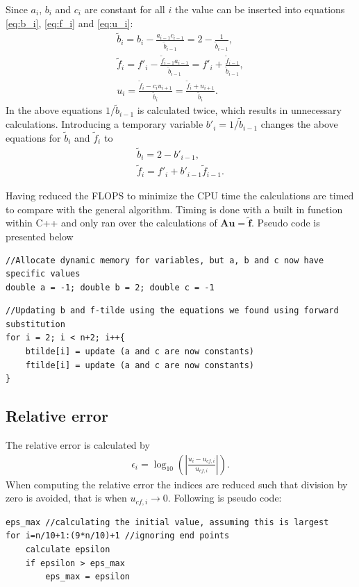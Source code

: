 \documentclass{emulateapj}
\begin{document}
Since $a_i$, $b_i$ and $c_i$ are constant for all $i$ the value can be inserted into equations \eqref{eq:b_i}, \eqref{eq:f_i} and \eqref{eq:u_i}:
%
\begin{gather*}
    \tilde{b}_i = b_i - \frac{a_{i-1}c_{i-1}}{\tilde{b}_{i-1}} = 2 - \frac{1}{\tilde{b}_{i-1}}, \\
    \tilde{f}_i = f'_i - \frac{\tilde{f}_{i-1} a_{i-1} }{\tilde{b}_{i-1}} = f'_i + \frac{\tilde{f}_{i-1}}{\tilde{b}_{i-1}}, \\
    u_i = \frac{\tilde{f}_i - c_i u_{i+1}}{\tilde{b}_i} = \frac{\tilde{f}_i + u_{i+1}}{\tilde{b}_i}.
\end{gather*}
%
In the above equations $1/\tilde{b}_{i-1}$ is calculated twice, which results in unnecessary calculations. Introducing a temporary variable $b'_i = 1/\tilde{b}_{i-1}$ changes the above equations for $\tilde{b}_i$ and $\tilde{f}_i$ to
%
\begin{gather*}
    \tilde{b}_i = 2 - b'_{i-1}, \\
    \tilde{f}_i = f'_i + b'_{i-1}\tilde{f}_{i-1}.
\end{gather*}
%

Having reduced the FLOPS to minimize the CPU time the calculations are timed to compare with the general algorithm. Timing is done with a built in function within C++ and only ran over the calculations of $\boldsymbol{A}\boldsymbol{u} = \boldsymbol{\tilde{f}}$. Pseudo code is presented below

%
\begin{lstlisting}
//Allocate dynamic memory for variables, but a, b and c now have specific values
double a = -1; double b = 2; double c = -1
\end{lstlisting}

\begin{lstlisting}
//Updating b and f-tilde using the equations we found using forward substitution
for i = 2; i < n+2; i++{
    btilde[i] = update (a and c are now constants)
    ftilde[i] = update (a and c are now constants)
}

\end{lstlisting}
%

\subsection{Relative error}
The relative error is calculated by
%
\begin{gather}
    \epsilon_i = \log_{10}\left(\left|\frac{u_i - u_{cf,i}}{u_{cf,i}}\right|\right).
\end{gather}
%
When computing the relative error the indices are reduced such that division by zero is avoided, that is when $u_{cf,i} \rightarrow 0$. Following is pseudo code:
\begin{lstlisting}
eps_max //calculating the initial value, assuming this is largest
for i=n/10+1:(9*n/10)+1 //ignoring end points
    calculate epsilon
    if epsilon > eps_max
        eps_max = epsilon
\end{lstlisting}
\end{document}
